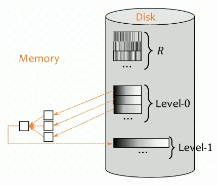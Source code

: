 \documentclass{article}
\begin{document}
      \begin{figure}[H]
        \centering 
        \includegraphics[scale=0.4]{img/merge.png}
        \caption{} 
        \label{fig:merge}
      \end{figure}
\end{document}
